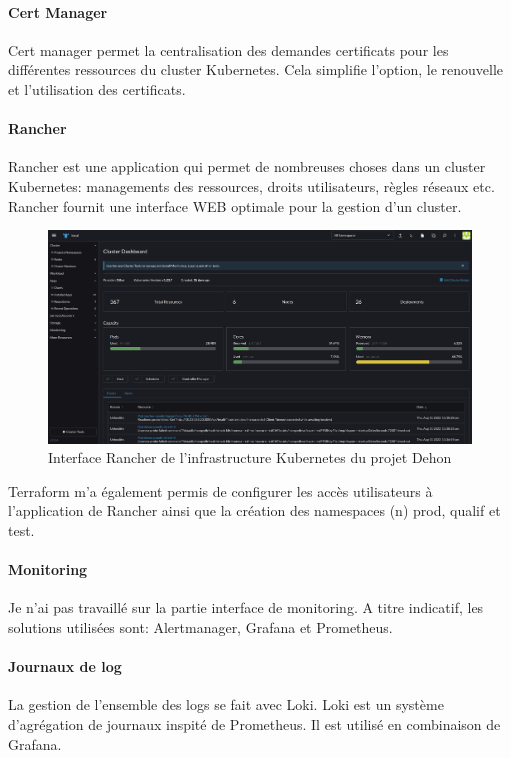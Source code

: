 \documentclass[12pt]{article}
\begin{document}
\paragraph{Cert Manager}
Cert manager permet la centralisation des demandes certificats pour les différentes ressources du \gls{cluster} \gls{Kubernetes}.
Cela simplifie l'option, le renouvelle et l'utilisation des certificats.

\paragraph{Rancher}
Rancher est une application qui permet de nombreuses choses dans un \gls{cluster} \gls{Kubernetes}: managements des ressources, droits utilisateurs, règles réseaux etc. 
Rancher fournit une interface WEB optimale pour la gestion d'un \gls{cluster}.

\begin{figure}[!ht]
    \centering
        \includegraphics[width=\textwidth]{src/interface_rancher.png}
    \caption{Interface Rancher de l'infrastructure \gls{Kubernetes} du projet Dehon}
    \label{fig:rancher_interface}
\end{figure}

Terraform m'a également permis de configurer les accès utilisateurs à l'application de Rancher ainsi que la création des namespaces (n) prod, qualif et test.

\paragraph{Monitoring}
Je n'ai pas travaillé sur la partie interface de monitoring.
A titre indicatif, les solutions utilisées sont: Alertmanager, Grafana et Prometheus.

\paragraph{Journaux de log}
La gestion de l'ensemble des logs se fait avec Loki.
Loki est un système d'agrégation de journaux inspité de Prometheus.
Il est utilisé en combinaison de Grafana.
\end{document}
